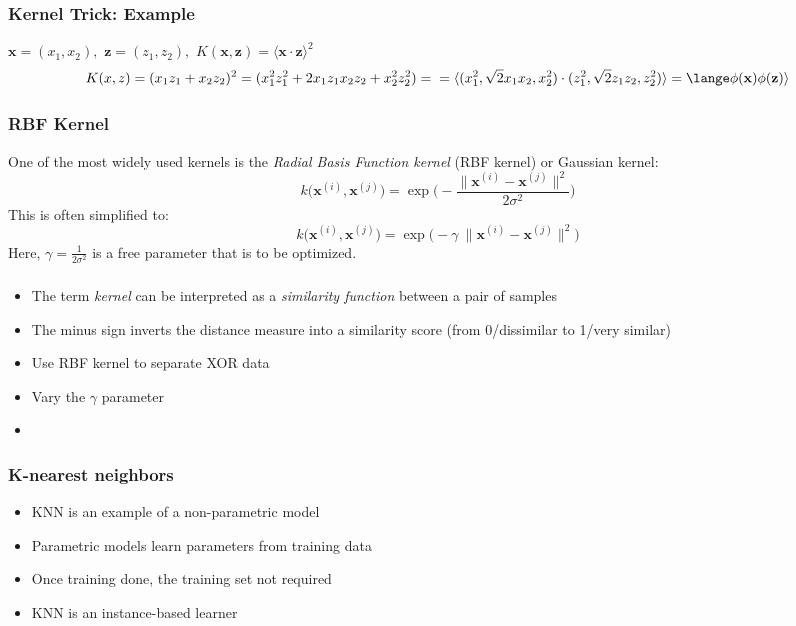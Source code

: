 \documentclass{beamer}
\begin{document}
\begin{frame}
  \frametitle{Kernel Trick: Example}
  $\mathbf{x} = (x_1, x_2), $
  $\mathbf{z} = (z_1, z_2), $ 
  $K(\mathbf{x}, \mathbf{z}) = \langle \mathbf{x} \cdot \mathbf{z} \rangle^2$
  \[
  K(x, z) = (x_1z_1 + x_2z_2)^2 = (x_1^2z_1^2 + 2x_1z_1x_2z_2 + x_2^2z_2^2) = \\
  = \langle (x_1^2, \sqrt{2}x_1x_2, x_2^2) \cdot (z_1^2, \sqrt{2}z_1z_2, z_2^2) \rangle
  = \lange \phi(\mathbf{x}) \phi(\mathbf{z}) \rangle
  \]
\end{frame}

\begin{frame}
  \frametitle{RBF Kernel}
  One of the most widely used kernels is the \textit{Radial Basis Function kernel} (RBF kernel) or Gaussian kernel:
  \[
  k \big( \mathbf{x}^{(i)}, \mathbf{x}^{(j)}  \big) = \exp \Bigg( - \frac{ \lVert \mathbf{x}^{(i)} - \mathbf{x}^{(j)} \rVert^2  }{2 \sigma^2} \Bigg)
  \]
  This is often simplified to:
  \[
  k \big( \mathbf{x}^{(i)}, \mathbf{x}^{(j)}  \big) = \exp \bigg(  -\gamma\ \lVert \mathbf{x}^{(i)} - \mathbf{x}^{(j)} \rVert^2  \bigg)
  \]
  Here, $\gamma = \frac{1}{2 \sigma^2}$ is a free parameter that is to be optimized.
\end{frame}

\begin{frame}
  \frametitle{}
  \begin{itemize}
  \item The term \textit{kernel} can be interpreted as a \textit{similarity function} between a pair of samples
  \item The minus sign inverts the distance measure into a similarity score (from 0/dissimilar to 1/very similar)
  \item Use RBF kernel to separate XOR data
  \item Vary the $\gamma$ parameter
  \item \href{https://github.com/rasbt/python-machine-learning-book/blob/master/code/ch03/ch03.ipynb}{}
  \end{itemize}
\end{frame}

\begin{frame}
  \frametitle{K-nearest neighbors}
  \begin{itemize}
  \item KNN is an example of a non-parametric model
  \item Parametric models learn parameters from training data
  \item Once training done, the training set not required
  \item KNN is an instance-based learner
  \end{itemize}
\end{frame}
\end{document}
